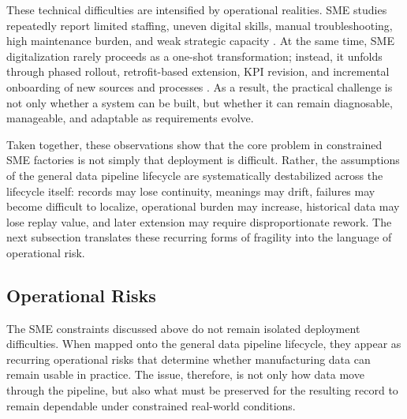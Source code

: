 \documentclass[systems,article,submit,pdftex,moreauthors]{Definitions/mdpi}
\begin{document}
These technical difficulties are intensified by operational realities. SME studies repeatedly report limited staffing, uneven digital skills, manual troubleshooting, high maintenance burden, and weak strategic capacity \cite{huang2025barriers, kumar2025digitalization, hulla2021towards, nasirinejad2024maintenance}. At the same time, SME digitalization rarely proceeds as a one-shot transformation; instead, it unfolds through phased rollout, retrofit-based extension, KPI revision, and incremental onboarding of new sources and processes \cite{chavez2020capability, doyle2019steps, mcfarlane2022digitalisation, banerjee2024lowcost}. As a result, the practical challenge is not only whether a system can be built, but whether it can remain diagnosable, manageable, and adaptable as requirements evolve.

Taken together, these observations show that the core problem in constrained SME factories is not simply that deployment is difficult. Rather, the assumptions of the general data pipeline lifecycle are systematically destabilized across the lifecycle itself: records may lose continuity, meanings may drift, failures may become difficult to localize, operational burden may increase, historical data may lose replay value, and later extension may require disproportionate rework. The next subsection translates these recurring forms of fragility into the language of operational risk.


\subsection{Operational Risks}
\label{sec:operational_risks}

The SME constraints discussed above do not remain isolated deployment difficulties. When mapped onto the general data pipeline lifecycle, they appear as recurring operational risks that determine whether manufacturing data can remain usable in practice. The issue, therefore, is not only how data move through the pipeline, but also what must be preserved for the resulting record to remain dependable under constrained real-world conditions.
\end{document}
